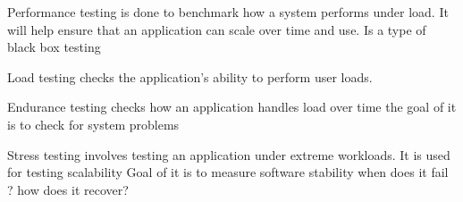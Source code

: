 Performance testing is done to benchmark how a system performs under load. 
  It will help ensure that an application can scale over time and use.
  Is a type of black box testing 

Load testing 
  checks the application's ability to perform user loads.

Endurance testing 
  checks how an application handles load over time 
  the goal of it is to check for system problems 

Stress testing 
  involves testing an application under extreme workloads. 
  It is used for testing scalability 
  Goal of it is to measure software stability 
  when does it fail ?
  how does it recover?
